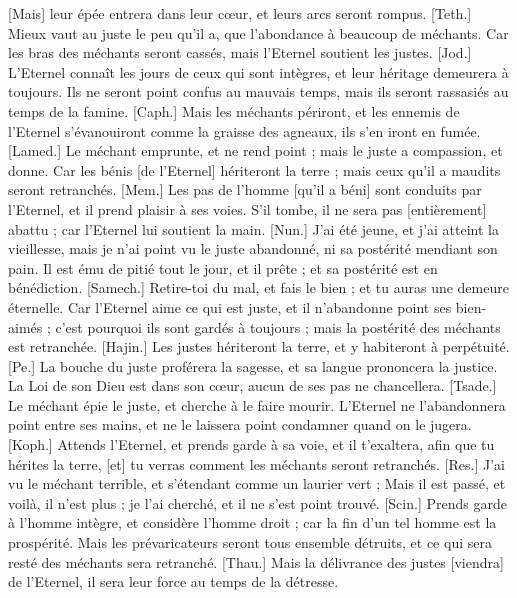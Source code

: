 \begin{multicols}{2}
[Mais] leur épée entrera dans leur cœur, et leurs arcs seront rompus.
[Teth.] Mieux vaut au juste le peu qu'il a, que l'abondance à beaucoup de méchants.
Car les bras des méchants seront cassés, mais l'Eternel soutient les justes.
[Jod.] L'Eternel connaît les jours de ceux qui sont intègres, et leur héritage demeurera à toujours.
Ils ne seront point confus au mauvais temps, mais ils seront rassasiés au temps de la famine.
[Caph.] Mais les méchants périront, et les ennemis de l'Eternel s'évanouiront comme la graisse des agneaux, ils s'en iront en fumée.
[Lamed.] Le méchant emprunte, et ne rend point ; mais le juste a compassion, et donne.
Car les bénis [de l'Eternel] hériteront la terre ; mais ceux qu'il a maudits seront retranchés.
[Mem.] Les pas de l'homme [qu'il a béni] sont conduits par l'Eternel, et il prend plaisir à ses voies.
S'il tombe, il ne sera pas [entièrement] abattu ; car l'Eternel lui soutient la main.
[Nun.] J'ai été jeune, et j'ai atteint la vieillesse, mais je n'ai point vu le juste abandonné, ni sa postérité mendiant son pain.
Il est ému de pitié tout le jour, et il prête ; et sa postérité est en bénédiction.
[Samech.] Retire-toi du mal, et fais le bien ; et tu auras une demeure éternelle.
Car l'Eternel aime ce qui est juste, et il n'abandonne point ses bien-aimés ; c'est pourquoi ils sont gardés à toujours ; mais la postérité des méchants est retranchée.
[Hajin.] Les justes hériteront la terre, et y habiteront à perpétuité.
[Pe.] La bouche du juste proférera la sagesse, et sa langue prononcera la justice.
La Loi de son Dieu est dans son cœur, aucun de ses pas ne chancellera.
[Tsade.] Le méchant épie le juste, et cherche à le faire mourir.
L'Eternel ne l'abandonnera point entre ses mains, et ne le laissera point condamner quand on le jugera.
[Koph.] Attends l'Eternel, et prends garde à sa voie, et il t'exaltera, afin que tu hérites la terre, [et] tu verras comment les méchants seront retranchés.
[Res.] J'ai vu le méchant terrible, et s'étendant comme un laurier vert ;
Mais il est passé, et voilà, il n'est plus ; je l'ai cherché, et il ne s'est point trouvé.
[Scin.] Prends garde à l'homme intègre, et considère l'homme droit ; car la fin d'un tel homme est la prospérité.
Mais les prévaricateurs seront tous ensemble détruits, et ce qui sera resté des méchants sera retranché.
[Thau.] Mais la délivrance des justes [viendra] de l'Eternel, il sera leur force au temps de la détresse.

\end{multicols}
